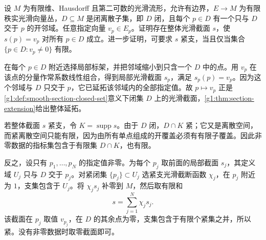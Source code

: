 \begin{exercise}\label{g1:ex:sections-on-closed-discrete-set}
	设 \(M\) 为有限维、Hausdorff 且第二可数的光滑流形，允许有边界，\(E\to M\) 为有限秩实光滑向量丛，\(D\subseteq M\) 是闭离散子集，即 \(D\) 闭，且每个 \(p\in D\) 有一个只与 \(D\) 交于 \(p\) 的开邻域。任意指定向量 \(v_p\in E_p\)。证明存在整体光滑截面 \(s\)，使 \(s(p)=v_p\) 对所有 \(p\in D\) 成立。进一步证明，可要求 \(s\) 紧支，当且仅当集合 \(\{p\in D:v_p\ne0\}\) 有限。
\end{exercise}
\begin{solution}
	在每个 \(p\in D\) 附近选择局部标架，并把邻域缩小到只含一个 \(D\) 中的点。用 \(v_p\) 在该点的分量作常系数线性组合，得到局部光滑截面 \(s_p\)，满足 \(s_p(p)=v_p\)。因为这个邻域与 \(D\) 只交于 \(p\)，它已延拓该邻域内的全部指定值。故 \(p\mapsto v_p\) 正是\cref{g1:def:smooth-section-closed-set}意义下闭集 \(D\) 上的光滑截面，\cref{g1:thm:section-extension}给出整体延拓。

	若整体截面 \(s\) 紧支，令 \(K=\operatorname{supp}s\)。由于 \(D\) 闭，\(D\cap K\) 紧；它又是离散空间，而紧离散空间只能有限，因为由所有单点组成的开覆盖必须有有限子覆盖。因此非零数据的指标集包含于有限集 \(D\cap K\)，也有限。

	反之，设只有 \(p_1,\ldots,p_N\) 的指定值非零。为每个 \(p_j\) 取前面的局部截面 \(s_j\)，其定义域 \(U_j\) 只与 \(D\) 交于 \(p_j\)。对紧闭集 \(\{p_j\}\subset U_j\) 选紧支光滑截断函数 \(\chi_j\)，在 \(p_j\) 附近为 \(1\)，支集包含于 \(U_j\)。将 \(\chi_j s_j\) 补零到 \(M\)，然后取有限和
	\[
		s=\sum_{j=1}^N\chi_j s_j.
	\]
	该截面在 \(p_j\) 取值 \(v_{p_j}\)，在 \(D\) 的其余点为零，支集包含于有限个紧集之并，所以紧。没有非零数据时取零截面即可。
\end{solution}

